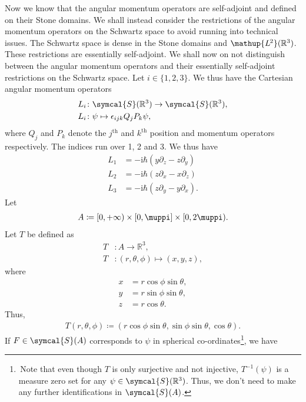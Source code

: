 \documentclass[12pt, a4 paper]{article}
\theoremstyle{definition}
\newcommand{\ltwo}{\mathup{L\kern-0.7pt^2}}
\newcommand{\ltworthree}{\ltwo(\rr^3)}
\newcommand{\position}{Q}
\newcommand{\momentum}{P}
\newcommand{\rthree}{\mathbb{R}^3}
\newcommand{\rr}{\mathbb{R}}
\newcommand{\schwartz}{\symcal{S}}
\newcommand{\schwartzrthree}{\schwartz(\rr^3)}
\renewcommand{\i}{\mathrm{i}}
\renewcommand{\pi}{\muppi}
\newcommand{\levi}{\epsilon_{ijk}}
\begin{document}
	Now we know that the angular momentum operators are self-adjoint and defined on their Stone domains. We shall instead consider the restrictions of the angular momentum operators on the Schwartz space to avoid running into technical issues. The Schwartz space is dense in the Stone domains and $\ltworthree$. These restrictions are essentially self-adjoint. We shall now on not distinguish between the angular momentum operators and their essentially self-adjoint restrictions on the Schwartz space. Let $i \in \{1,2,3\}$. We thus have the Cartesian angular momentum operators
	\begin{align*}
	    L_i &\colon \schwartzrthree \rightarrow \schwartzrthree,\\
		L_i &\colon \psi \mapsto \levi\position_j\momentum_k\psi,
	\end{align*}
	where $\position_j$ and $\momentum_k$ denote the $j^\text{th}$ and $k^\text{th}$ position and momentum operators respectively. The indices run over 1, 2 and 3.
	We thus have
	\begin{align*}
	    L_1 &= -\i\hbar(y\partial_z - z\partial_y)\\
		L_2 &= -\i\hbar(z\partial_x - x\partial_z)\\
		L_3 &= -\i\hbar(z\partial_y - y\partial_x).
	\end{align*}
	Let
	\begin{align*}
	    A \coloneq [0, +\infty) \times [0,\pi] \times [0,2\pi).
	\end{align*}
	Let $T$ be defined as
	\begin{align*}
		T &\colon A \rightarrow \rthree,\\
		T &\colon (r, \theta, \phi) \mapsto (x, y, z),
	\end{align*}
	where
	\begin{align*}
		x &= r \cos{\phi} \sin{\theta},\\
		y &= r \sin{\phi} \sin{\theta},\\
		z &= r \cos{\theta}.
	\end{align*}
	Thus,
	\begin{align*}
	    T(r, \theta, \phi) \coloneq (r \cos{\phi} \sin{\theta}, \sin{\phi} \sin{\theta}, \cos{\theta}).
	\end{align*}
	If $F \in \schwartz(A)$ corresponds to $\psi$ in spherical co-ordinates\footnote{\,Note that even though $T$ is only surjective and not injective, $T^{-1}(\psi)$ is a measure zero set for any $\psi \in \schwartzrthree$. Thus, we don't need to make any further identifications in $\schwartz(A)$.}, we have
\end{document}
